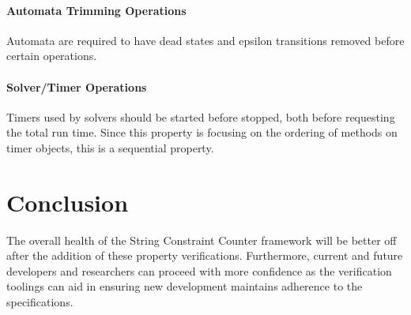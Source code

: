 \documentclass[letterpaper,11pt,twocolumn]{article}
\begin{document}
\paragraph{Automata Trimming Operations} Automata are required to have dead states and epsilon
transitions removed before certain operations.

\paragraph{Solver/Timer Operations} Timers used by solvers should be started before stopped,
both before requesting the total run time.  Since this property is focusing on
the ordering of methods on timer objects, this is a sequential property.

\section{Conclusion}

The overall health of the String Constraint Counter framework will be better
off after the addition of these property verifications.  Furthermore, current
and future developers and researchers can proceed with more confidence as the
verification toolings can aid in ensuring new development maintains adherence
to the specifications.



\end{document}
